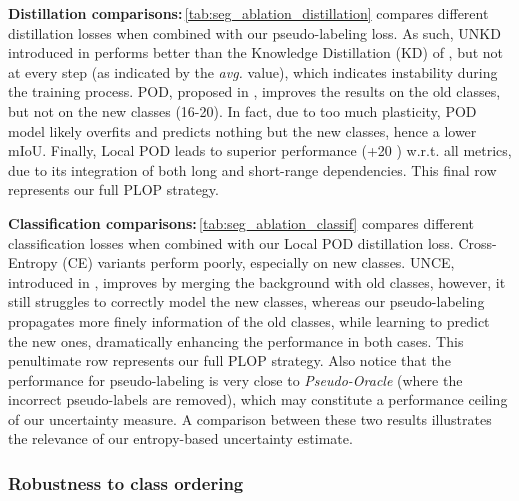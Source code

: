 \noindent\textbf{Distillation comparisons:\,}\autoref{tab:seg_ablation_distillation} compares
different distillation losses when combined with our pseudo-labeling loss. As such, UNKD introduced
in \cite{cermelli2020modelingthebackground} performs better than the Knowledge Distillation (KD) of
\cite{hinton2015knowledge_distillation}, but not at every step (as indicated by the \textit{avg.}
value), which indicates instability during the training process. POD, proposed in
\cite{douillard2020podnet}, improves the results on the old classes, but not on the new classes
(16-20). In fact, due to too much plasticity, POD model likely overfits and predicts nothing but the
new classes, hence a lower \ac{mIoU}.  Finally, Local POD leads to superior performance (+20 \pp)
w.r.t. all metrics, due to its integration of both long and short-range dependencies. This final row
represents our full PLOP strategy.


\noindent\textbf{Classification comparisons:\,}\autoref{tab:seg_ablation_classif} compares different
classification losses when combined with our Local POD distillation loss. Cross-Entropy (CE)
variants perform poorly, especially on new classes. UNCE, introduced in
\cite{cermelli2020modelingthebackground}, improves by merging the background with old classes,
however, it still struggles to correctly model the new classes, whereas our pseudo-labeling
propagates more finely information of the old classes, while learning to predict the new ones,
dramatically enhancing the performance in both cases. This penultimate row represents our full PLOP
strategy. Also notice that the performance for pseudo-labeling is very close to
\textit{Pseudo-Oracle} (where the incorrect pseudo-labels are removed), which may constitute a
performance ceiling of our uncertainty measure. A comparison between these two results illustrates
the relevance of our entropy-based uncertainty estimate.

\subsubsection{Robustness to class ordering}

